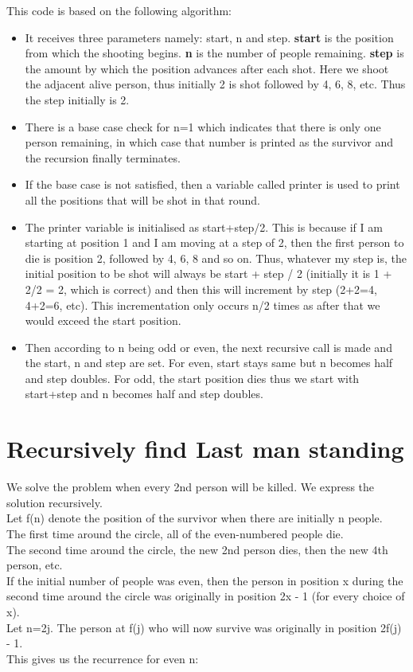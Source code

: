 \documentclass{article}
\begin{document}
This code is based on the following algorithm:
\begin{itemize}
  \item  It receives three parameters namely: start, n and step. \textbf{start} is the position from which the shooting begins. \textbf{n} is the number of people remaining. \textbf{step} is the amount by which the position advances after each shot. Here we shoot the adjacent alive person, thus initially 2 is shot followed by 4, 6, 8, etc. Thus the step initially is 2.
  \item  There is a base case check for n=1 which indicates that there is only one person remaining, in which case that number is printed as the survivor and the recursion finally terminates.
  \item  If the base case is not satisfied, then a variable called printer is used to print all the positions that will be shot in that round.
  \item The printer variable is initialised as start+step/2. This is because if I am starting at position 1 and I am moving at a step of 2, then the first person to die is position 2, followed by 4, 6, 8 and so on. Thus, whatever my step is, the initial position to be shot will always be start + step / 2 (initially it is 1 + 2/2 = 2, which is correct) and then this will increment by step (2+2=4, 4+2=6, etc). This incrementation only occurs n/2 times as after that we would exceed the start position.
  \item Then according to n being odd or even, the next recursive call is made and the start, n and step are set. For even, start stays same but n becomes half and step doubles. For odd, the start position dies thus we start with start+step and n becomes half and step doubles.
\end{itemize}

\section{Recursively find Last man standing}

We solve the problem when every 2nd person will be killed. We express the solution recursively. \\
Let f(n) denote the position of the survivor when there are initially n people.\\
The first time around the circle, all of the even-numbered people die.\\
The second time around the circle, the new 2nd person dies, then the new 4th person, etc.\\
If the initial number of people was even, then the person in position x during the second time around the circle was originally in position 2x - 1 (for every choice of x).\\
Let n=2j. The person at f(j) who will now survive was originally in position 2f(j) - 1.\\
This gives us the recurrence for even n:
\end{document}
